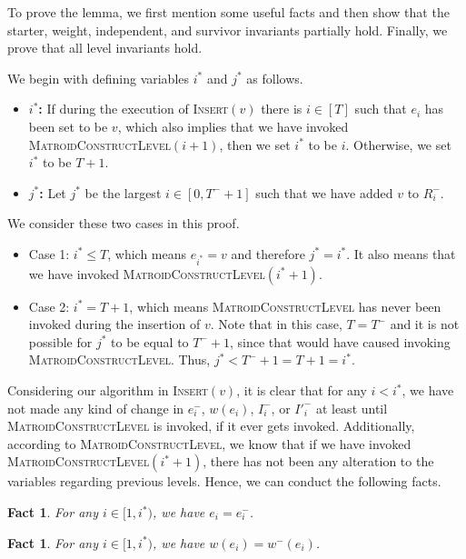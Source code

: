 \documentclass[11pt]{article}
\newtheorem{fact}[theorem]{Fact}
\newcommand{\MatroidConstLevel}{\textsc{MatroidConstructLevel}}
\newcommand{\insertv}{{\textsc{Insert}}}
\begin{document}
To prove the lemma, we first mention some useful facts and then show that the starter, weight, independent, and survivor invariants partially hold. Finally, we prove that all level invariants hold.



We begin with defining variables $i^*$ and $j^*$ as follows.


\begin{itemize}
    \item \textbf{$i^*$: } If during the execution of \insertv$(v)$ there is  $i\in [T]$ such that $e_{i}$ has been set to be $v$, which also implies that we have invoked \MatroidConstLevel $(i + 1)$, then we set $i^*$ to be $i$. Otherwise, we set $i^*$ to be $T + 1$. 
    \item \textbf{$j^*$: } Let $j^*$ be the largest $i\in [0, T^-+1]$ such that we have added $v$ to $R_i^-$.
\end{itemize}


We consider these two cases in this proof. 
\begin{itemize}
    \item Case 1: $i^* \leq T$, which means $e_{i^*} = v$ and therefore $j^* = i^*$. It also means that we have invoked \MatroidConstLevel $(i^* + 1)$.
    \item Case 2: $i^* = T + 1$, which means \MatroidConstLevel{} has never been invoked  during the insertion of $v$.
    Note that in this case, $T = T^-$ and it is not possible for $j^*$ to be equal to $T^- + 1$, since that would have caused invoking \MatroidConstLevel.  Thus, $j^* < T^-+1 = T+1 =i^*$.
\end{itemize}


Considering our algorithm in \insertv$(v)$, 
it is clear that for any $i < i^*$, we have not made any kind of change in $e_i^-$, $w(e_i)$, $I^-_i$, or $I'^-_i$ at least until \MatroidConstLevel{} is invoked, if it ever gets invoked. 
Additionally, according to \MatroidConstLevel, we know that if we have invoked \MatroidConstLevel$(i^* + 1)$, there has not been any alteration to the variables regarding previous levels. 
Hence, we can conduct the following facts.


\begin{fact}
\label{fact:iprev:e}
For any $i \in [1, i^*)$, we have $e_i = e_i^-$.
\end{fact}

\begin{fact}
\label{fact:iprev:w}
For any $i \in [1, i^*)$, we have $w(e_i) = w^-(e_i)$.
\end{fact}
\end{document}
